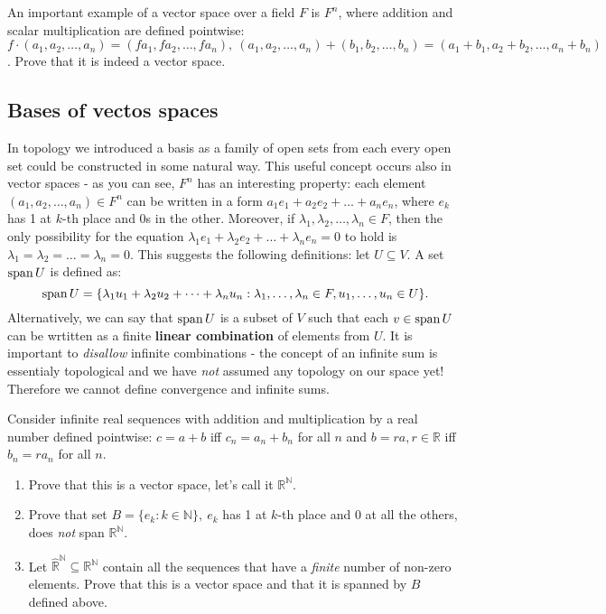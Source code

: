 \begin{prob}
  An important example of a vector space over a field $F$ is $F^n$, where addition and scalar multiplication are defined pointwise:
  $f\cdot (a_1, a_2, \dots, a_n) = (fa_1, fa_2, \dots, fa_n),~(a_1, a_2, \dots, a_n) + (b_1, b_2, \dots, b_n)=(a_1+b_1, a_2+b_2, \dots, a_n+b_n)$. Prove that it is indeed a vector space.
\end{prob}

\subsection{Bases of vectos spaces}
In topology we introduced a basis as a family of open sets from each every open set could be constructed in some natural way. This useful concept occurs also in vector spaces -
as you can see, $F^n$ has an interesting property: each element $(a_1, a_2, \dots, a_n)\in F^n$ can be written in a form $a_1e_1+a_2e_2+\dots+a_ne_n$, where $e_k$ has 1 at $k$-th place
and 0s in the other. Moreover, if $\lambda_1, \lambda_2, \dots, \lambda_n\in F$, then the only possibility for the equation $\lambda_1e_1+\lambda_2e_2+\dots+\lambda_ne_n=0$ to hold
is $\lambda_1=\lambda_2=\dots=\lambda_n=0$. This suggests the following definitions: let $U\subseteq V$. A set $\text{span\,} U$ is defined as:
$$ \text{span\,} U = \{\lambda_1u_1+\lambda_2u_2+\dots+\lambda_nu_n : \lambda_1, \dots, \lambda_n\in F, u_1, \dots, u_n\in U\}.$$
Alternatively, we can say that $\text{span\,} U$ is a subset of $V$ such that each $v\in \text{span\,} U$ can be wrtitten as a finite \textbf{linear combination} of elements from $U$. It is important
to \textit{disallow} infinite combinations - the concept of an infinite sum is essentialy topological and we have \textit{not} assumed any topology on our space yet! Therefore we cannot define convergence and infinite sums.

\begin{prob}
  Consider infinite real sequences with addition and multiplication by a real number defined pointwise: $c=a+b$ iff $c_n=a_n+b_n$ for all $n$ and $b=ra, r\in \mathbb R$ iff $b_n=ra_n$ for all $n$.
  \begin{enumerate}
    \item Prove that this is a vector space, let's call it $\mathbb R^{\mathbb N}$.
    \item Prove that set $B=\{e_k : k\in \mathbb N\},~e_k$ has 1 at $k$-th place and 0 at all the others, does \textit{not} span $\mathbb R^{\mathbb N}$.
    \item Let $\hat{\mathbb R}^{\mathbb N}\subseteq \mathbb R^{\mathbb N}$ contain all the sequences that have a \textit{finite} number of non-zero elements. Prove that this is a
      vector space and that it is spanned by $B$ defined above.
  \end{enumerate}
\end{prob}

